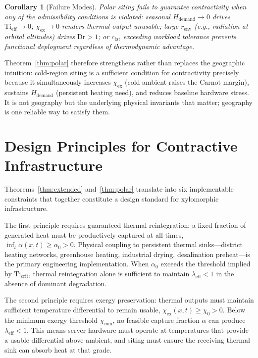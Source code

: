 \documentclass[10pt,twocolumn]{article}
\theoremstyle{plain}
\newtheorem{corollary}[theorem]{Corollary}
\theoremstyle{definition}
\theoremstyle{remark}
\begin{document}
\begin{corollary}[Failure Modes]
Polar siting fails to guarantee contractivity when any of the
admissibility conditions is violated: seasonal $H_{\mathrm{demand}}
\to 0$ drives $\mathrm{Ti}_{\mathrm{eff}} \to 0$; $\chi_{\mathrm{ex}}
\to 0$ renders thermal output unusable; large $r_{\mathrm{env}}$
(e.g., radiation at orbital altitudes) drives $\mathrm{Dr} > 1$; or
$c_{\mathrm{lat}}$ exceeding workload tolerance prevents functional
deployment regardless of thermodynamic advantage.
\end{corollary}

Theorem~\ref{thm:polar} therefore strengthens rather than replaces the
geographic intuition: cold-region siting is a sufficient condition for
contractivity precisely because it simultaneously increases
$\chi_{\mathrm{ex}}$ (cold ambient raises the Carnot margin),
sustains $H_{\mathrm{demand}}$ (persistent heating need), and
reduces baseline hardware stress. It is not geography but the
underlying physical invariants that matter; geography is one reliable
way to satisfy them.

\section{Design Principles for Contractive Infrastructure}
\label{sec:design}

Theorems~\ref{thm:extended} and~\ref{thm:polar} translate into six
implementable constraints that together constitute a design standard
for xylomorphic infrastructure.

The first principle requires guaranteed thermal reintegration: a
fixed fraction of generated heat must be productively captured at all
times, $\inf_t \alpha(x,t) \geq \alpha_0 > 0$. Physical coupling to
persistent thermal sinks---district heating networks, greenhouse
heating, industrial drying, desalination preheat---is the primary
engineering implementation. When $\alpha_0$ exceeds the threshold
implied by $\mathrm{Ti}_{\mathrm{crit}}$, thermal reintegration alone
is sufficient to maintain $\lambda_{\mathrm{eff}} < 1$ in the absence
of dominant degradation.

The second principle requires exergy preservation: thermal outputs must
maintain sufficient temperature differential to remain usable,
$\chi_{\mathrm{ex}}(x,t) \geq \chi_0 > 0$. Below the minimum exergy
threshold $\chi_{\min}$, no feasible capture fraction $\alpha$ can
produce $\lambda_{\mathrm{eff}} < 1$. This means server hardware
must operate at temperatures that provide a usable differential above
ambient, and siting must ensure the receiving thermal sink can absorb
heat at that grade.
\end{document}
